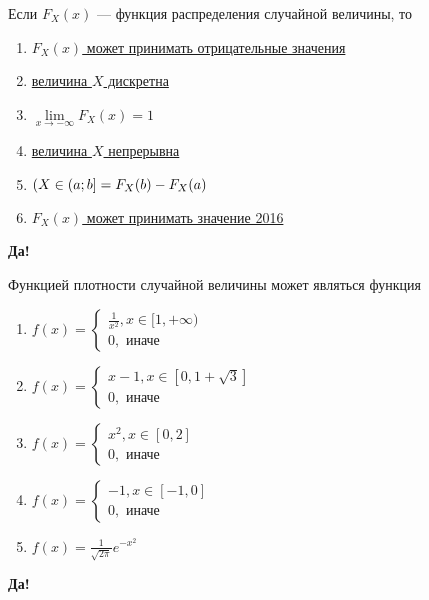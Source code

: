 \documentclass[t]{beamer}
\let\P\relax
\DeclareMathOperator{\P}{\mathbb{P}}
\begin{document}
 \begin{frame} \label{9-Yes} 
\begin{block}{9} 

  Если $F_X(x)$ — функция распределения случайной величины, то
  


 \end{block} 
\begin{enumerate} 
\item[] \hyperlink{9-No}{\beamergotobutton{} $F_X(x)$ может принимать отрицательные значения}
\item[] \hyperlink{9-No}{\beamergotobutton{} величина $X$ дискретна}
\item[] \hyperlink{9-No}{\beamergotobutton{} $\lim\limits_{x \rightarrow -\infty} F_X(x) = 1 $}
\item[] \hyperlink{9-No}{\beamergotobutton{} величина $X$ непрерывна}
\item[] \hyperlink{9-Yes}{\beamergotobutton{}  $\P(X \in (a;b] = F_X(b) - F_X(a)$}
\item[] \hyperlink{9-No}{\beamergotobutton{} $F_X(x)$ может принимать значение 2016}
\end{enumerate} 

 \textbf{Да!} 
 \hyperlink{10}{}\end{frame} 


 \begin{frame} \label{10-Yes} 
\begin{block}{10} 

Функцией плотности случайной величины может являться функция
  


 \end{block} 
\begin{enumerate} 
\item[] \hyperlink{10-Yes}{\beamergotobutton{} $f(x) = \begin{cases}
	\frac{1}{x^2}, x \in [1,+ \infty) \\
	0,\text{ иначе}
	\end{cases}$}
\item[] \hyperlink{10-No}{\beamergotobutton{} $ f(x) = \begin{cases}
	x - 1, x \in [0,1+\sqrt{3}] \\
	0,\text{ иначе}
	\end{cases}$}
\item[] \hyperlink{10-No}{\beamergotobutton{} $ f(x) = \begin{cases}
	x^2, x \in [0,2] \\
	0,\text{ иначе}
	\end{cases}$}
\item[] \hyperlink{10-No}{\beamergotobutton{} $ f(x) = \begin{cases}
	-1, x \in [-1, 0] \\
	0,\text{ иначе}
	\end{cases}$}
\item[] \hyperlink{10-No}{\beamergotobutton{} $ f(x) = \frac{1}{\sqrt{2\pi}} e^{-x^2}$}
\end{enumerate} 

 \textbf{Да!} 
 \hyperlink{11}{}\end{frame} 
\end{document}

